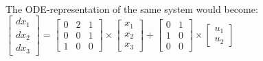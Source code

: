 \setlength\fboxsep{0pt}
\setlength\fboxrule{0.5pt}
\\\newline The ODE-representation of the same system would become:\\\newline
$\left[ \begin{array}{c} dx_1 \\ dx_2 \\ dx_3 \end{array} \right]
= \begin{bmatrix} 0 & 2 & 1 \\ 0 & 0 & 1 \\ 1 & 0 & 0 \end{bmatrix} \times \left[ \begin{array}{c} x_1 \\ x_2 \\ x_3 \end{array} \right] + \begin{bmatrix} 0 & 1 \\ 1 & 0 \\ 0 & 0 \end{bmatrix} \times \left[ \begin{array}{c} u_1 \\ u_2 \end{array} \right]$
